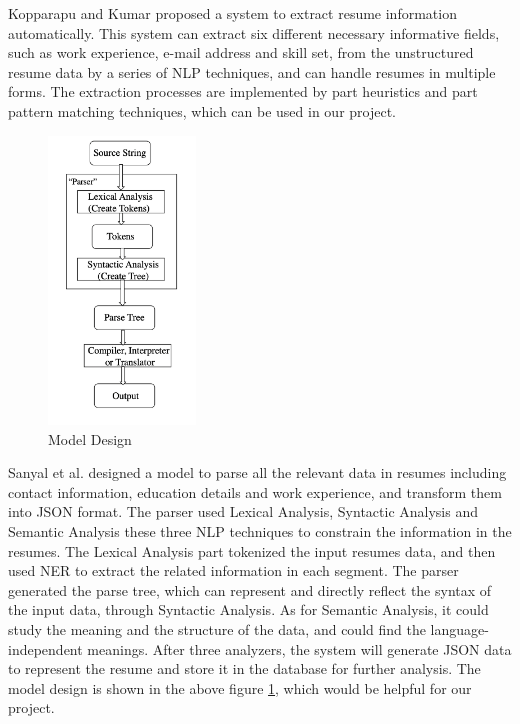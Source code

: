 Kopparapu and Kumar \cite{kopparapu2010automatic} proposed a system to extract resume information automatically. This system can extract six different necessary informative fields, such as work experience, e-mail address and skill set, from the unstructured resume data by a series of NLP techniques, and can handle resumes in multiple forms. The extraction processes are implemented by part heuristics and part pattern matching techniques, which can be used in our project.
 \begin{figure}[H]
    \centering
    \includegraphics[width=0.35\textwidth]{images/model.png}
    \caption{Model Design \cite{sanyal2017resume}}
    \label{fig:1}
\end{figure}


Sanyal et al. \cite{sanyal2017resume} designed a model to parse all the relevant data in resumes including contact information, education details and work experience, and transform them into JSON format. The parser used Lexical Analysis, Syntactic Analysis and Semantic Analysis these three NLP techniques to constrain the information in the resumes. The Lexical Analysis part tokenized the input resumes data, and then used NER to extract the related information in each segment. The parser generated the parse tree, which can represent and directly reflect the syntax of the input data, through Syntactic Analysis. As for Semantic Analysis, it could study the meaning and the structure of the data, and could find the language-independent meanings. After three analyzers, the system will generate JSON data to represent the resume and store it in the database for further analysis. The model design is shown in the above figure \ref{fig:1}, which would be helpful for our project.



